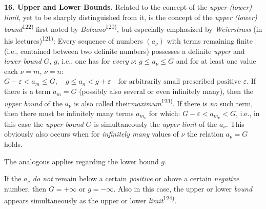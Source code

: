 \thispagestyle{fancy}

\vspace{0.5cm}

\textbf{16. Upper and Lower Bounds.} Related to the concept of the \textit{upper (lower) limit}, yet to be sharply distinguished from it, is the concept of the \textit{upper (lower) bound}\textsuperscript{122)} first noted by \textit{Bolzano}\textsuperscript{120)}, but especially emphasized by \textit{Weierstrass} (in his lectures)\textsuperscript{121)}: Every sequence of numbers $(a_\nu)$ with terms remaining finite (i.e., contained between two definite numbers) possesses a definite \textit{upper} and \textit{lower bound} $G$, $g$, i.e., one has for \textit{every} $\nu$: $g \leq a_\nu \leq G$ and for at least one value each $\nu = m$, $\nu = n$: $G - \varepsilon < a_m \leq G, \quad g \leq a_n < g + \varepsilon \quad \text{for arbitrarily small prescribed positive } \varepsilon.$ If there is a term $a_m = G$ (possibly also several or even infinitely many), then the \textit{upper bound} of the $a_\nu$ is also called their\textit{maximum}\textsuperscript{123)}. If there is \textit{no} such term, then there must be infinitely many terms $a_{m_\nu}$ for which: $G - \varepsilon < a_{m_\nu} < G$, i.e., in this case the \textit{upper bound} $G$ is simultaneously the \textit{upper limit} of the $a_\nu$. This obviously also occurs when for \textit{infinitely many} values of $\nu$ the relation $a_\nu = G$ holds.

The analogous applies regarding the lower bound $g$.

If the $a_\nu$ \textit{do not} remain below a certain \textit{positive} or above a certain \textit{negative} number, then $G = +\infty$ or $g = -\infty$. Also in this case, the upper or lower \textit{bound} appears simultaneously as the upper or lower \textit{limit}\textsuperscript{124)}.

